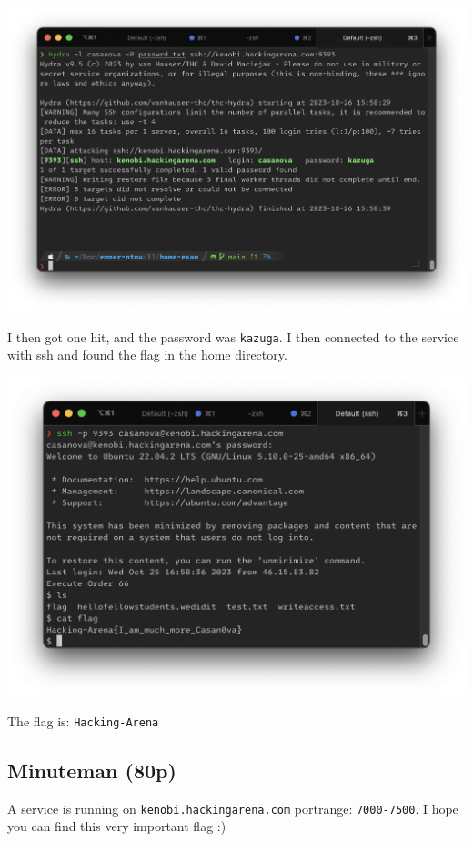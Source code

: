 \begin{center}
    \includegraphics[width=15cm]{img/Get in touch with services/Casanova/Skjermbilde 2023-10-26 kl. 15.59.05.png}
\end{center}

I then got one hit, and the password was \texttt{kazuga}. I then connected to the service with ssh and found the flag in the home directory.

\begin{center}
    \includegraphics[width=15cm]{img/Get in touch with services/Casanova/Skjermbilde 2023-10-26 kl. 15.59.48.png}
\end{center}

The flag is: \texttt{Hacking-Arena}

\newpage
\subsection{Minuteman (80p)}
A service is running on \texttt{kenobi.hackingarena.com} portrange: \texttt{7000-7500}. I hope you can find this very important flag :)

